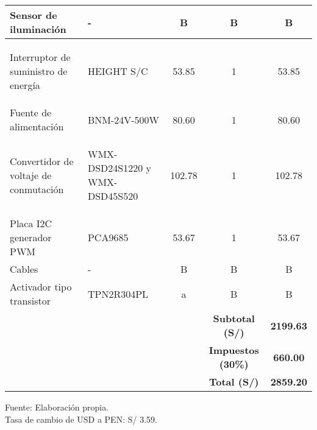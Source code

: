 \begin{table}[H]
\begin{tabular}{llc|c|c|}
		\multicolumn{1}{|l|}{Sensor de iluminación}  & \multicolumn{1}{l|}{-} & B & B & B \\ \hline
		\multicolumn{1}{|l|}{\begin{minipage}{\mythirdmaxsizeofcontenttable}\begin{myflushleftinsidetable}
					Interruptor de suministro de energía
		\end{myflushleftinsidetable}\end{minipage}}
		&
		\multicolumn{1}{l|}{HEIGHT S/C} & 53.85 & 1 & 53.85 \\ \hline
		\multicolumn{1}{|l|}{Fuente de alimentación}  & \multicolumn{1}{l|}{BNM-24V-500W} & 80.60 & 1 & 80.60 \\ \hline		
		\multicolumn{1}{|l|}{\begin{minipage}{\mythirdmaxsizeofcontenttable}\begin{myflushleftinsidetable}
					Convertidor de voltaje de conmutación
		\end{myflushleftinsidetable}\end{minipage}}
		&
		\multicolumn{1}{l|}{\begin{minipage}{\mythirdmaxsizeofcontenttable}\begin{myflushleftinsidetable}
				WMX-DSD24S1220 y WMX-DSD45S520
		\end{myflushleftinsidetable}\end{minipage}}
		 & 102.78 & 1 & 102.78 \\ \hline
		\multicolumn{1}{|l|}{Placa I2C generador PWM}  & \multicolumn{1}{l|}{PCA9685} & 53.67 & 1 & 53.67 \\ \hline
		\multicolumn{1}{|l|}{Cables} & \multicolumn{1}{l|}{-} & B & B & B \\ \hline
		\multicolumn{1}{|l|}{Activador tipo transistor}  & \multicolumn{1}{l|}{TPN2R304PL} & a & B & B \\ \hline
		&  &  & \textbf{Subtotal (S/)} & \textbf{2199.63} \\ \cline{4-5} 
		&  &  & \textbf{Impuestos (30\%)} & \textbf{660.00} \\ \cline{4-5} 
		&  &  & \textbf{Total (S/)} & \textbf{2859.20} \\ \cline{4-5} 
	\end{tabular}
		\begin{myflushcenteraftertable}	
		Fuente: Elaboración propia. \\
		Tasa de cambio de USD a PEN: S/ 3.59.
	\end{myflushcenteraftertable}
\end{table}

